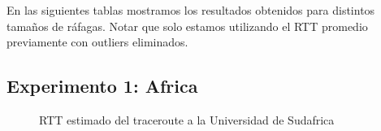 En las siguientes tablas mostramos los resultados obtenidos para distintos tamaños de ráfagas. Notar que solo estamos utilizando el RTT promedio previamente con outliers eliminados.

\newpage

\subsection{Experimento 1: Africa}

\begin{landscape}

\end{landscape}

\begin{figure}[H]
  \centering
  \caption{RTT estimado del traceroute a la Universidad de Sudafrica}
  \label{africaTTL}
\end{figure}

